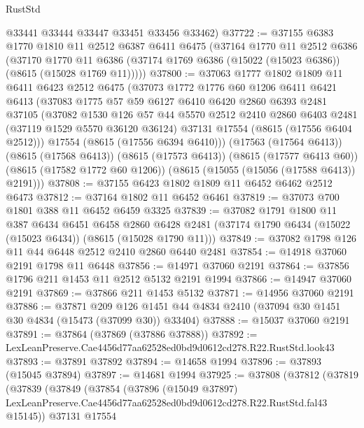 \begin{lexlean}{RustStd}
\begin{coremodule}
      @33441
      @33444
      @33447
      @33451
      @33456
      @33462)
@37722 := @37155
    @6383
    @1770
    @1810
    @11
    @2512
    @6387
    @6411
    @6475
    (@37164
      @1770
      @11
      @2512
      @6386
      (@37170
        @1770
        @11
        @6386
        (@37174 @1769 @6386 (@15022 (@15023 @6386)) (@8615 (@15028 @1769 @11)))))
@37800 := @37063
    @1777
    @1802
    @1809
    @11
    @6411
    @6423
    @2512
    @6475
    (@37073
      @1772
      @1776
      @60
      @1206
      @6411
      @6421
      @6413
      (@37083
        @1775
        @57
        @59
        @6127
        @6410
        @6420
        @2860
        @6393
        @2481
        @37105
        (@37082
          @1530
          @126
          @57
          @44
          @5570
          @2512
          @2410
          @2860
          @6403
          @2481
          (@37119 @1529 @5570 @36120 @36124)
          @37131
          @17554
          (@8615 (@17556 @6404 @2512)))
        @17554
        (@8615 (@17556 @6394 @6410)))
      (@17563 (@17564 @6413))
      (@8615 (@17568 @6413))
      (@8615 (@17573 @6413))
      (@8615 (@17577 @6413 @60))
      (@8615 (@17582 @1772 @60 @1206))
      (@8615 (@15055 (@15056 (@17588 @6413)) @2191)))
@37808 := @37155 @6423 @1802 @1809 @11 @6452 @6462 @2512 @6473
@37812 := @37164 @1802 @11 @6452 @6461
@37819 := @37073 @700 @1801 @388 @11 @6452 @6459 @3325
@37839 := @37082
    @1791
    @1800
    @11
    @387
    @6434
    @6451
    @6458
    @2860
    @6428
    @2481
    (@37174 @1790 @6434 (@15022 (@15023 @6434)) (@8615 (@15028 @1790 @11)))
@37849 := @37082 @1798 @126 @11 @44 @6448 @2512 @2410 @2860 @6440 @2481
@37854 := @14918 @37060 @2191 @1798 @11 @6448
@37856 := @14971 @37060 @2191
@37864 := @37856 @1796 @211 @1453 @11 @2512 @5132 @2191 @1994
@37866 := @14947 @37060 @2191
@37869 := @37866 @211 @1453 @5132
@37871 := @14956 @37060 @2191
@37886 := @37871
    @209
    @126
    @1451
    @44
    @4834
    @2410
    (@37094 @30 @1451 @30 @4834 (@15473 (@37099 @30)) @33404)
@37888 := @15037 @37060 @2191
@37891 := @37864 (@37869 (@37886 @37888))
@37892 := LexLeanPreserve.Cae4456d77aa62528ed0bd9d0612cd278.R22.RustStd.look43
@37893 := @37891 @37892
@37894 := @14658 @1994
@37896 := @37893 (@15045 @37894)
@37897 := @14681 @1994
@37925 := @37808
    (@37812
      (@37819
        (@37839
          (@37849
            (@37854
              (@37896
                (@15049 @37897)
                LexLeanPreserve.Cae4456d77aa62528ed0bd9d0612cd278.R22.RustStd.fal43
                @15145))
            @37131
            @17554

\end{coremodule}
\end{lexlean}
